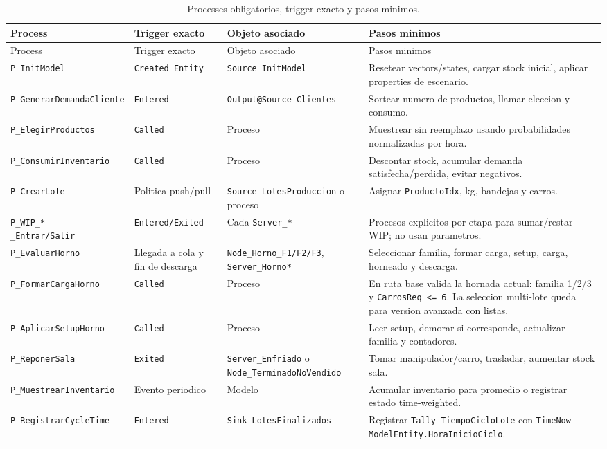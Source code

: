 \documentclass[11pt]{article}
\newcommand{\simio}[1]{\texttt{#1}}
\newcommand{\state}[1]{\texttt{#1}}
\newcommand{\proc}[1]{\texttt{#1}}
\begin{document}
{\scriptsize
\setlength{\tabcolsep}{2pt}
\begin{longtable}{@{}L{3.45cm}L{3.25cm}L{2.85cm}L{5.0cm}@{}}
\caption{Processes obligatorios, trigger exacto y pasos minimos.}\\
\toprule
{}
\color{white}Process & \color{white}Trigger exacto & \color{white}Objeto asociado & \color{white}Pasos minimos \\
\midrule
\endfirsthead
\toprule
{}
\color{white}Process & \color{white}Trigger exacto & \color{white}Objeto asociado & \color{white}Pasos minimos \\
\midrule
\endhead
\proc{P\_InitModel} & \simio{Created Entity} & \simio{Source\_InitModel} & Resetear vectors/states, cargar stock inicial, aplicar properties de escenario. \\
\proc{P\_GenerarDemandaCliente} & \simio{Entered} & \simio{Output@Source\_Clientes} & Sortear numero de productos, llamar eleccion y consumo. \\
\proc{P\_ElegirProductos} & \simio{Called} & Proceso & Muestrear sin reemplazo usando probabilidades normalizadas por hora. \\
\proc{P\_ConsumirInventario} & \simio{Called} & Proceso & Descontar stock, acumular demanda satisfecha/perdida, evitar negativos. \\
\proc{P\_CrearLote} & Politica push/pull & \simio{Source\_LotesProduccion} o proceso & Asignar \state{ProductoIdx}, kg, bandejas y carros. \\
\makecell[l]{\proc{P\_WIP\_*}\\\proc{\_Entrar/Salir}} & \simio{Entered/Exited} & Cada \simio{Server\_*} & Procesos explicitos por etapa para sumar/restar WIP; no usan parametros. \\
\proc{P\_EvaluarHorno} & Llegada a cola y fin de descarga & \simio{Node\_Horno\_F1/F2/F3}, \simio{Server\_Horno*} & Seleccionar familia, formar carga, setup, carga, horneado y descarga. \\
\proc{P\_FormarCargaHorno} & \simio{Called} & Proceso & En ruta base valida la hornada actual: familia 1/2/3 y \state{CarrosReq <= 6}. La seleccion multi-lote queda para version avanzada con listas. \\
\proc{P\_AplicarSetupHorno} & \simio{Called} & Proceso & Leer setup, demorar si corresponde, actualizar familia y contadores. \\
\proc{P\_ReponerSala} & \simio{Exited} & \simio{Server\_Enfriado} o \simio{Node\_TerminadoNoVendido} & Tomar manipulador/carro, trasladar, aumentar stock sala. \\
\proc{P\_MuestrearInventario} & Evento periodico & Modelo & Acumular inventario para promedio o registrar estado time-weighted. \\
\proc{P\_RegistrarCycleTime} & \simio{Entered} & \simio{Sink\_LotesFinalizados} & Registrar \simio{Tally\_TiempoCicloLote} con \state{TimeNow - ModelEntity.HoraInicioCiclo}. \\
\bottomrule
\end{longtable}
}
\end{document}
